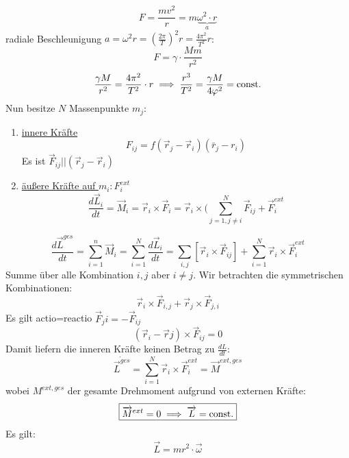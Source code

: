 \documentclass[a4paper,10pt]{scrartcl}
\begin{document}
\[
 F=\frac{mv^2}{r}=m \underbrace{\omega^2\cdot r}_{a}
\]
radiale Beschleunigung $a= \omega^2 r= (\frac{2\pi}{T})^2r= \frac{4\pi^2}{T^2} r$:
\[
 F=\gamma \cdot \frac{Mm}{r^2}
\]
\[
 \frac{\gamma M}{r^2}= \frac{4\pi^2}{T^2} \cdot r \implies \frac{r^3}{T^2}=\frac{\gamma M}{4\varphi^2}=\text{const}.
\]
Nun besitze $N$ Massenpunkte $m_j$: 
\begin{enumerate}
 \item \underline{innere Kräfte}\\
        \[
         F_{ij}=f(\vec r_j- \vec r_i) (\bar r_j-r_i)
        \]
	Es ist $\vec F_{ij} || (\vec r_j-\vec r_i)$
\item \underline{äußere Kräfte auf $m_i: F_i^{ext}$}\\
\[
 \frac{d\vec L_i}{dt}=\vec M_i=\vec r_i\times \vec F_i= \vec r_i \times (\sum_{j=1, j\neq i}^N \vec F_{ij}+ \vec F_i^{ext}
\]
\end{enumerate}
\[
 \frac{d\vec  L^{ges}}{dt}=\sum_{i=1}^n \vec M_i=\sum_{i=1}^N \frac{d\vec L_i}{dt}= \sum_{i,j} [\vec r_i\times \vec F_{ij}]+ \sum_{i=1}^N \vec r_i \times \vec F_i^{ext}
\]
Summe über alle Kombination $i,j$ aber $i\neq j$. Wir betrachten die symmetrischen Kombinationen:
\[
 \vec r_i\times \vec F_{i,j}+\vec r_j \times \vec F_{j,i}
\]
Es gilt actio=reactio $\vec F_ji=-\vec F_{ij}$
\[
 (\vec r_i- \vec rj) \times \vec F_{ij}=0
\]
Damit liefern die inneren Kräfte keinen Betrag zu $\frac{dL}{dt}$:
\[
 \dot {\vec L^{ges}}= \sum_{i=1}^N  \vec r_i \times  \vec F_i^{ext}= \vec M^{ext, ges}
\]
wobei $M^{ext, ges}$ der gesamte Drehmoment aufgrund von externen Kräfte:
\[
 \boxed{\overrightarrow{M}^{ext}=0 \implies \overrightarrow{L}= \text{const}.}
\]
Es gilt:
\[
 \boxed{\vec L= mr^2\cdot \vec \omega}
\]
\end{document}

